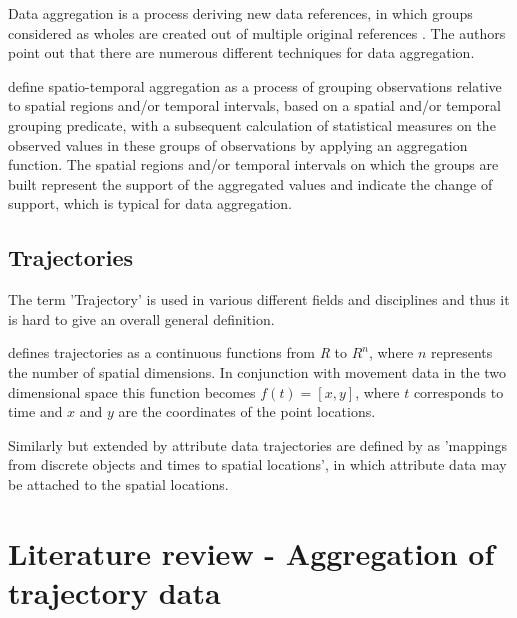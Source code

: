 \documentclass[12pt, oneside, a4paper]{scrbook}
\begin{document}
Data aggregation is a process deriving new data references, in which groups considered as wholes are created out of multiple original references \citep{andrienko2006exploratory}. The authors point out that there are numerous different techniques for data aggregation.
\par\medskip

\citet{stasch_meaningful_2014} define spatio-temporal aggregation as a process of grouping observations relative to spatial regions and/or temporal intervals, based on a spatial and/or temporal grouping predicate, with a subsequent calculation of statistical measures on the observed values in these groups of observations by applying an aggregation function.
The spatial regions and/or temporal intervals on which the groups are built represent the support of the aggregated values and indicate the change of support, which is typical for data aggregation.
\par\medskip

\subsection*{Trajectories}
The term 'Trajectory' is used in various different fields and disciplines and thus it is hard to give an overall general definition.
\par\medskip

\citet{roduit2009trajectory} defines trajectories as a continuous functions from \textit{R} to $R^n$, where $n$ represents the number of spatial dimensions.
In conjunction with movement data in the two dimensional space this function becomes $f(t) = [x, y]$, where $t$ corresponds to time and $x$ and $y$ are the coordinates of the point locations.
\par\medskip

Similarly but extended by attribute data trajectories are defined by \citet{stasch_meaningful_2014} as 'mappings from discrete objects and times to spatial locations', in which attribute data may be attached to the spatial locations.
\par\medskip


\section{Literature review - Aggregation of trajectory data}
\end{document}

